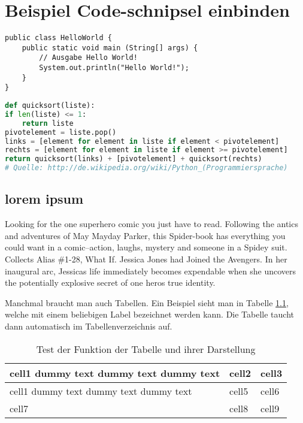 
\chapter{Beispiel Code-schnipsel einbinden}


\begin{lstlisting}[caption=Code-Beispiel, label=Bsp.1]
public class HelloWorld {
	public static void main (String[] args) {
		// Ausgabe Hello World!
		System.out.println("Hello World!");
	}
}
\end{lstlisting}

\begin{lstlisting}[caption=Python-Code, label=Python-Code,language=Python]
def quicksort(liste):
if len(liste) <= 1:
	return liste
pivotelement = liste.pop()
links = [element for element in liste if element < pivotelement]
rechts = [element for element in liste if element >= pivotelement]
return quicksort(links) + [pivotelement] + quicksort(rechts)
# Quelle: http://de.wikipedia.org/wiki/Python_(Programmiersprache)
\end{lstlisting}

\section{lorem ipsum}
Looking for the one superhero comic you just have to read. Following the antics and adventures of May Mayday Parker, this Spider-book has everything you could want in a comic--action, laughs, mystery and someone in a Spidey suit. Collects Alias \#1-28, What If. Jessica Jones had Joined the Avengers. In her inaugural arc, Jessicas life immediately becomes expendable when she uncovers the potentially explosive secret of one heros true identity. 

Manchmal braucht man auch Tabellen. Ein Beispiel sieht man in Tabelle \ref{tabelle1}, welche mit einem beliebigen Label bezeichnet werden kann. Die Tabelle taucht dann automatisch im Tabellenverzeichnis auf.

\begin{table}[h!]
\begin{center}
\begin{tabular}{ | m{5cm} | m{1cm}| m{1cm} | } 
\hline
cell1 dummy text dummy text dummy text& cell2 & cell3 \\ 
\hline
cell1 dummy text dummy text dummy text & cell5 & cell6 \\ 
\hline
cell7 & cell8 & cell9 \\ 
\hline
\end{tabular}
\end{center}
\caption{Test der Funktion der Tabelle und ihrer Darstellung}
\label{tabelle1}
\end{table}


